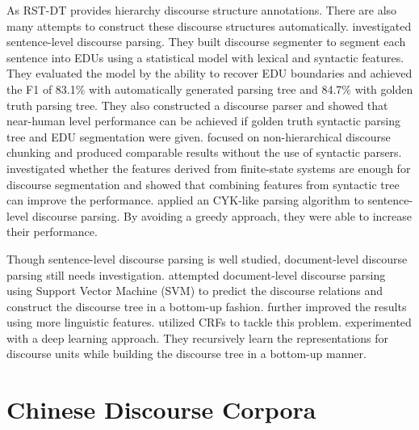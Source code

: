 As RST-DT provides hierarchy discourse structure annotations. There are also many
attempts to construct these discourse structures automatically. \cite{soricut2003sentence}
investigated sentence-level discourse parsing. They built discourse segmenter to
segment each sentence into EDUs using a statistical model with lexical and syntactic features.
They evaluated the model by the ability to recover EDU boundaries and achieved the F1 of
83.1\% with automatically generated parsing tree and 84.7\% with golden truth parsing tree.
They also constructed a discourse parser and showed that near-human level performance can be achieved
if golden truth syntactic parsing tree and EDU segmentation were given. \cite{sporleder2005} focused
on non-hierarchical discourse chunking and produced comparable results without the use of
syntactic parsers. \cite{fisher2007utility} investigated whether the features derived from finite-state
systems are enough for discourse segmentation and showed that combining features from syntactic tree
can improve the performance. \cite{joty2012novel} applied an CYK-like parsing algorithm
to sentence-level discourse parsing. By avoiding a greedy approach, they were able to increase
their performance.

Though sentence-level discourse parsing is well studied, document-level discourse
parsing still needs investigation. \cite{hernault2010hilda} attempted
document-level discourse parsing using Support Vector Machine (SVM) to
predict the discourse relations and construct the discourse tree in
a bottom-up fashion. \cite{feng2012text} further improved the results using more
linguistic features. \cite{joty2013combining} utilized CRFs to tackle this problem.
\cite{li2014recursive} experimented with a deep learning approach.
They recursively learn the representations for discourse units
while building the discourse tree in a bottom-up manner.


\section{Chinese Discourse Corpora}

